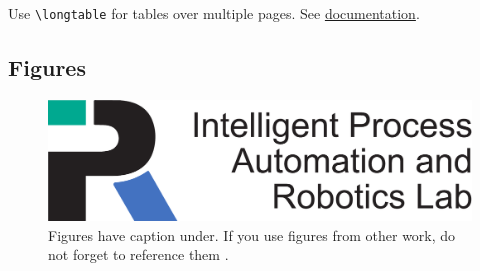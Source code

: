 Use \texttt{\textbackslash longtable} for tables over multiple pages. See \href{https://de.wikibooks.org/wiki/LaTeX-W%C3%B6rterbuch:_longtable_(Umgebung)}{documentation}.

\subsection{Figures}
\begin{figure}[H]
    \centering
    \includegraphics[width=0.8\columnwidth]{Aux/Logos/KIT-Departments/IPRLogo_en}
    \caption{Figures have caption under. If you use figures from other work, do not forget to reference them \cite{deininger2005studien}.}
    \label{fig:figure_caption}
\end{figure}

